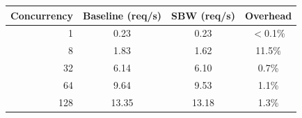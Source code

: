\begin{tabular}{@{}rccc@{}}
\toprule
Concurrency & Baseline (req/s) & SBW (req/s) & Overhead \\
\midrule
1 & 0.23 & 0.23 & $<$0.1\% \\
8 & 1.83 & 1.62 & 11.5\% \\
32 & 6.14 & 6.10 & 0.7\% \\
64 & 9.64 & 9.53 & 1.1\% \\
128 & 13.35 & 13.18 & 1.3\% \\
\bottomrule
\end{tabular}
